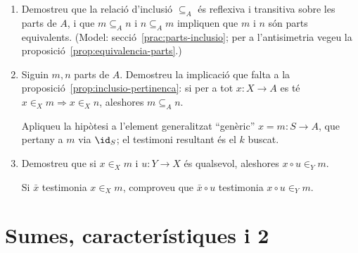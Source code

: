 \begin{enumerate}[resume]
  \item Demostreu que la relació d'inclusió \(\subseteq_A\) és reflexiva i transitiva sobre les parts de \(A\), i que \(m\subseteq_A n\) i \(n\subseteq_A m\) impliquen que \(m\) i \(n\) són parts equivalents. (Model: secció~\ref{prac:parts-inclusio}; per a l'antisimetria vegeu la proposició~\ref{prop:equivalencia-parts}.)

  \item Siguin \(m,n\) parts de \(A\). Demostreu la implicació que falta a la proposició~\ref{prop:inclusio-pertinenca}: si per a tot \(x:X\to A\) es té \(x\in_X m\Rightarrow x\in_X n\), aleshores \(m\subseteq_A n\). \begin{indicacio}Apliqueu la hipòtesi a l'element generalitzat \enquote{genèric} \(x=m:S\to A\), que pertany a \(m\) via \(\id_S\); el testimoni resultant és el \(k\) buscat.\end{indicacio}

  \item Demostreu que si \(x\in_X m\) i \(u:Y\to X\) és qualsevol, aleshores \(x\circ u\in_Y m\). \begin{indicacio}Si \(\bar x\) testimonia \(x\in_X m\), comproveu que \(\bar x\circ u\) testimonia \(x\circ u\in_Y m\).\end{indicacio}
\end{enumerate}

\section{Sumes, característiques i \texorpdfstring{\(\mathbf2\)}{2}}


